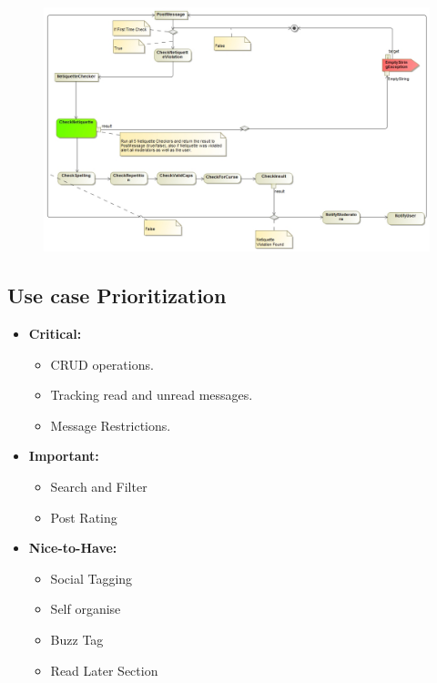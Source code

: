 \documentclass[11pt]{article}
\begin{document}
\begin{enumerate}
\begin{itemize}
\begin{figure}[H]
	  			\includegraphics[scale=0.35]{NetProcessDiagram.jpg}
	  		\end{figure}
	  	\end{itemize}

\end{enumerate}




\subsection{Use case Prioritization}
\begin{itemize}
\item \textbf{Critical: }
	\begin{itemize}
		\item CRUD operations.
		\item Tracking read and unread messages.
		\item Message Restrictions.
	\end{itemize}

\item \textbf{Important: }
	\begin{itemize}
		\item Search and Filter
		\item Post Rating
	\end{itemize}

\item \textbf{Nice-to-Have: }
	\begin{itemize}
		\item Social Tagging
		\item Self organise
		\item Buzz Tag
		\item Read Later Section
	\end{itemize}
\end{itemize}
\end{document}
